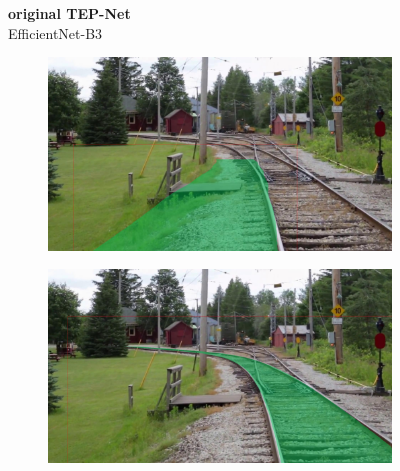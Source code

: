 \begin{figure}[H]
    \centering
    \begin{minipage}{0.2\textwidth} %
        \centering
        \textbf{original TEP-Net}\\
        EfficientNet-B3
    \end{minipage}%
    \hfill
    \begin{minipage}{0.6\textwidth} %
        \centering
        \begin{subfigure}[b]{0.48\textwidth}
            \centering
            \includegraphics[width=\textwidth]{PICs/experiments/ComparisonBaselineToImproved/original2.jpg}
        \end{subfigure}
        \begin{subfigure}[b]{0.48\textwidth}
            \centering
            \includegraphics[width=\textwidth]{PICs/experiments/ComparisonBaselineToImproved/adapted2.jpg}
        \end{subfigure}
        
        \vspace{0.5cm} %
        

\end{minipage}
\end{figure}
